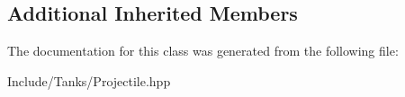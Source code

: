 \subsection*{Additional Inherited Members}


The documentation for this class was generated from the following file\+:\begin{DoxyCompactItemize}
\item 
Include/\+Tanks/Projectile.\+hpp\end{DoxyCompactItemize}
